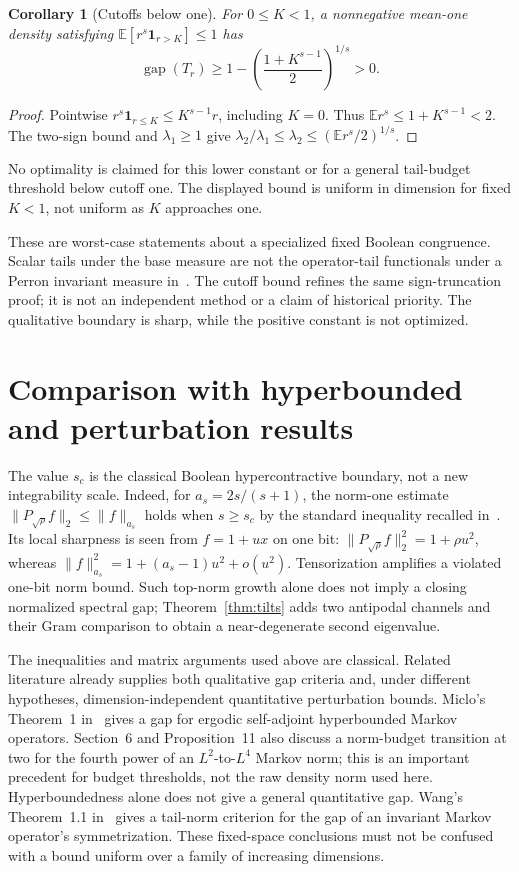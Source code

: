 \documentclass[11pt]{article}
\newtheorem{corollary}[theorem]{Corollary}
\newcommand{\gap}{\operatorname{gap}}
\begin{document}
\begin{corollary}[Cutoffs below one]\label{cor:cutoff-below-one}
For $0\le K<1$, a nonnegative mean-one density satisfying
$\mathbb E[r^s\mathbf1_{r>K}]\le1$ has
\[
 \gap(T_r)\ge1-\left(\frac{1+K^{s-1}}2\right)^{1/s}>0.
\]
\end{corollary}
\begin{proof}
Pointwise $r^s\mathbf1_{r\le K}\le K^{s-1}r$, including $K=0$.
Thus $\mathbb E r^s\le1+K^{s-1}<2$. The two-sign bound and
$\lambda_1\ge1$ give
$\lambda_2/\lambda_1\le\lambda_2\le(\mathbb E r^s/2)^{1/s}$.
\end{proof}
No optimality is claimed for this lower constant or for a general
tail-budget threshold below cutoff one. The displayed bound is uniform
in dimension for fixed $K<1$, not uniform as $K$ approaches one.

These are worst-case statements about a specialized fixed Boolean
congruence. Scalar tails under the base measure are not the operator-tail
functionals under a Perron invariant measure in~\cite{Wang}. The cutoff
bound refines the same sign-truncation proof; it is not an independent
method or a claim of historical priority. The qualitative boundary is
sharp, while the positive constant is not optimized.

\section{Comparison with hyperbounded and perturbation results}
The value $s_c$ is the classical Boolean hypercontractive boundary,
not a new integrability scale. Indeed, for $a_s=2s/(s+1)$, the
norm-one estimate $\|P_{\sqrt\rho}f\|_2\le\|f\|_{a_s}$ holds
when $s\ge s_c$ by the standard inequality recalled in~\cite{MOS}.
Its local sharpness is seen from $f=1+ux$ on one bit:
$\|P_{\sqrt\rho}f\|_2^2=1+\rho u^2$, whereas
$\|f\|_{a_s}^2=1+(a_s-1)u^2+o(u^2)$.
Tensorization amplifies a violated one-bit norm bound. Such top-norm
growth alone does not imply a closing normalized spectral gap;
Theorem~\ref{thm:tilts} adds two antipodal channels and their Gram
comparison to obtain a near-degenerate second eigenvalue.

The inequalities and matrix arguments used above are classical. Related
literature already supplies both qualitative gap criteria and, under
different hypotheses, dimension-independent quantitative perturbation
bounds. Miclo's Theorem~1 in~\cite{Miclo} gives a gap for ergodic
self-adjoint hyperbounded Markov operators. Section~6 and
Proposition~11 also discuss a norm-budget transition at two for the
fourth power of an $L^2$-to-$L^4$ Markov norm; this is an important
precedent for budget thresholds, not the raw density norm used here.
Hyperboundedness alone does not give a general quantitative gap. Wang's Theorem~1.1 in~\cite{Wang} gives a tail-norm criterion
for the gap of an invariant Markov operator's symmetrization.
These fixed-space conclusions must not be confused with a bound uniform
over a family of increasing dimensions.
\end{document}
